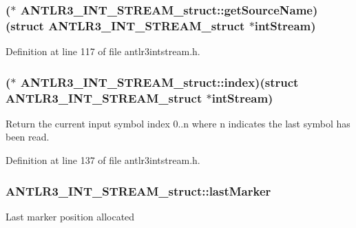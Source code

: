 \hypertarget{struct_a_n_t_l_r3___i_n_t___s_t_r_e_a_m__struct_ad71ca21244172b4a0dc36efa8fbeec53}{
\subsubsection[{get\-Source\-Name}]{($\ast$ A\-N\-T\-L\-R3\-\_\-\-I\-N\-T\-\_\-\-S\-T\-R\-E\-A\-M\-\_\-struct\-::get\-Source\-Name)(struct {\bf A\-N\-T\-L\-R3\-\_\-\-I\-N\-T\-\_\-\-S\-T\-R\-E\-A\-M\-\_\-struct} $\ast$int\-Stream)}}\label{struct_a_n_t_l_r3___i_n_t___s_t_r_e_a_m__struct_ad71ca21244172b4a0dc36efa8fbeec53}


Definition at line 117 of file antlr3intstream.\-h.

\hypertarget{struct_a_n_t_l_r3___i_n_t___s_t_r_e_a_m__struct_a5141407fe8b50ff4e87f617811fd54fc}{
\subsubsection[{index}]{($\ast$ A\-N\-T\-L\-R3\-\_\-\-I\-N\-T\-\_\-\-S\-T\-R\-E\-A\-M\-\_\-struct\-::index)(struct {\bf A\-N\-T\-L\-R3\-\_\-\-I\-N\-T\-\_\-\-S\-T\-R\-E\-A\-M\-\_\-struct} $\ast$int\-Stream)}}\label{struct_a_n_t_l_r3___i_n_t___s_t_r_e_a_m__struct_a5141407fe8b50ff4e87f617811fd54fc}
Return the current input symbol index 0..n where n indicates the last symbol has been read. 

Definition at line 137 of file antlr3intstream.\-h.

\hypertarget{struct_a_n_t_l_r3___i_n_t___s_t_r_e_a_m__struct_af2daa94a7e071dc3acad6deb01ecae5c}{
\subsubsection[{last\-Marker}]{ A\-N\-T\-L\-R3\-\_\-\-I\-N\-T\-\_\-\-S\-T\-R\-E\-A\-M\-\_\-struct\-::last\-Marker}}\label{struct_a_n_t_l_r3___i_n_t___s_t_r_e_a_m__struct_af2daa94a7e071dc3acad6deb01ecae5c}
Last marker position allocated 

